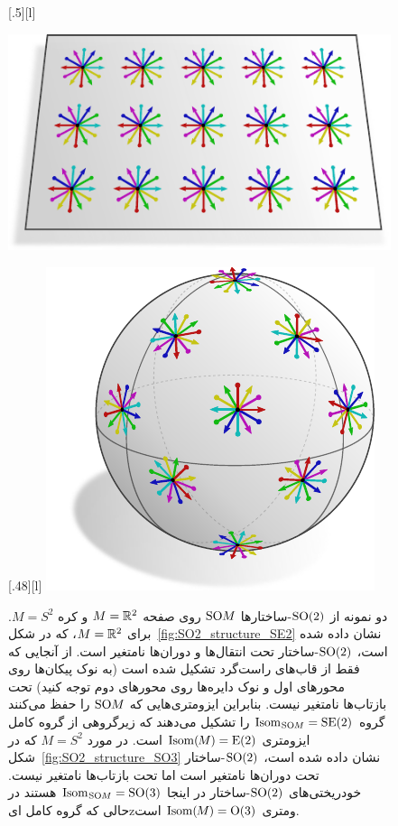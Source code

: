 \begin{figure}
    \centering
        [.5\linewidth][l]{
            \includegraphics[width=.5\textwidth]{figures/SO2_structure_SE2.pdf}
            \rule{0pt}{20pt}
        }
        [.48\linewidth][l]{
            \includegraphics[width=.4\textwidth]{figures/SO2_structure_SO3.pdf}
        }
    \caption[]{\small
        دو نمونه از $\operatorname{SO}(2)$-ساختارها $\operatorname{SO}\mkern-3.6muM$ روی صفحه $M = \mathbb{R}^2$ و کره $M = S^2$.
        برای ${M = \mathbb{R}^2}$، که در شکل~\ref{fig:SO2_structure_SE2} نشان داده شده است، $\operatorname{SO}(2)$-ساختار تحت انتقال‌ها و دوران‌ها نامتغیر است.
        از آنجایی که فقط از قاب‌های راست‌گرد تشکیل شده است (به نوک پیکان‌ها روی محورهای اول و نوک دایره‌ها روی محورهای دوم توجه کنید) تحت بازتاب‌ها نامتغیر نیست.
        بنابراین ایزومتری‌هایی که $\operatorname{SO}\mkern-3.6muM$ را حفظ می‌کنند گروه $\operatorname{Isom}_{\mkern1mu\operatorname{SO}\mkern-3.6muM} = \operatorname{SE}(2)$ را تشکیل می‌دهند که زیرگروهی از گروه کامل ایزومتری $\operatorname{Isom}(\mkern-1.5mu M \mkern-.5mu) = \operatorname{E}(2)$ است.
        در مورد $M = S^2$ که در شکل~\ref{fig:SO2_structure_SO3} نشان داده شده است، $\operatorname{SO}(2)$-ساختار تحت دوران‌ها نامتغیر است اما تحت بازتاب‌ها نامتغیر نیست.
        خودریختی‌های $\operatorname{SO}(2)$-ساختار در اینجا $\operatorname{Isom}_{\mkern1mu\operatorname{SO}\mkern-3.6muM} = \operatorname{SO}(3)$ هستند در حالی که گروه کامل ایzومتری $\operatorname{Isom}(\mkern-1.5mu M \mkern-.5mu) = \operatorname{O}(3)$ است.
        }
    \label{fig:SO2_structures_SE2_SO3}
\end{figure}















